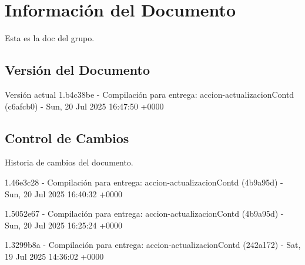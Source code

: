 \documentclass[
	a4paper, %
	12pt, %
]{include/CSSullivanBusinessReport}
\begin{document}
\newpage

\begin{twothirdswidth} %
	\tableofcontents %
\end{twothirdswidth}

\newpage


\newpage

\section{Información del
Documento}\label{sec:informaciuxf3n-del-documento}

Esta es la doc del grupo.

\subsection{Versión del Documento}\label{sec:versiuxf3n-del-documento}

\begin{quote}
\end{quote}

Versión actual 1.b4c38be - Compilación para entrega:
accion-actualizacionContd (c6afcb0) - Sun, 20 Jul 2025 16:47:50 +0000

\subsection{Control de Cambios}\label{sec:control-de-cambios}

Historia de cambios del documento.

1.46e3c28 - Compilación para entrega: accion-actualizacionContd
(4b9a95d) - Sun, 20 Jul 2025 16:40:32 +0000

1.5052e67 - Compilación para entrega: accion-actualizacionContd
(4b9a95d) - Sun, 20 Jul 2025 16:25:24 +0000

1.3299b8a - Compilación para entrega: accion-actualizacionContd
(242a172) - Sat, 19 Jul 2025 14:36:02 +0000
\end{document}
